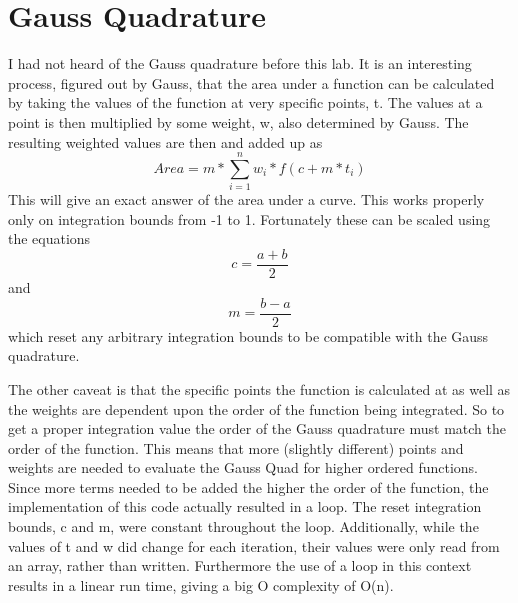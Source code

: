 \documentclass{article}
\begin{document}
\section{Gauss Quadrature}
I had not heard of the Gauss quadrature before this lab. It is an interesting process, figured out by Gauss, that the area under a function can be calculated by taking the values of the function at very specific points, t. The values at a point is then multiplied by some weight, w, also determined by Gauss. The resulting weighted values are then and added up as
\begin{equation}
    Area = m*\sum_{i=1}^{n} w_i*f(c+m*t_i)
\end{equation}
This will give an exact answer of the area under a curve. This works properly only on integration bounds from -1 to 1. Fortunately these can be scaled using the equations
\begin{equation}
    c = \frac{a+b}{2}
\end{equation}
and
\begin{equation}
    m = \frac{b-a}{2}
\end{equation}
which reset any arbitrary integration bounds to be compatible with the Gauss quadrature.

The other caveat is that the specific points the function is calculated at as well as the weights are dependent upon the order of the function being integrated. So to get a proper integration value the order of the Gauss quadrature must match the order of the function. This means that more (slightly different) points and weights are needed to evaluate the Gauss Quad for higher ordered functions. Since more terms needed to be added the higher the order of the function, the implementation of this code actually resulted in a loop. The reset integration bounds, c and m, were constant throughout the loop. Additionally, while the values of t and w did change for each iteration, their values were only read from an array, rather than written. Furthermore the use of a loop in this context results in a linear run time, giving a big O complexity of O(n).
\end{document}
